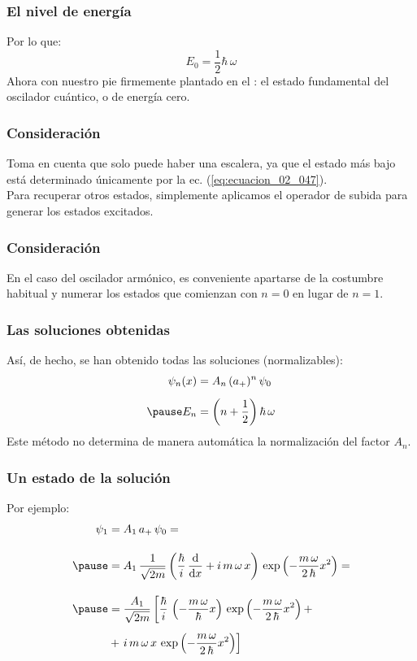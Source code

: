 \documentclass[12pt]{beamer}
\begin{document}
\begin{frame}
\frametitle{El nivel de energía}
Por lo que:
\pause
\begin{equation}
E_{0} = \dfrac{1}{2} \hbar \, \omega
\label{eq:ecuacion_02_049}
\end{equation}
\pause
Ahora con nuestro pie firmemente plantado en el : \pause el estado fundamental del oscilador cuántico, o de energía cero.
\end{frame}
\begin{frame}
\frametitle{Consideración}
Toma en cuenta que solo puede haber una escalera, ya que el estado más bajo está determinado únicamente por la ec. (\ref{eq:ecuacion_02_047}).
\\
\bigskip
\pause
Para recuperar otros estados, simplemente aplicamos el operador de subida para generar los estados excitados.
\end{frame}
\begin{frame}
\frametitle{Consideración}
En el caso del oscilador armónico, es conveniente apartarse de la costumbre habitual y numerar los estados que comienzan con $n = 0$ en lugar de $n = 1$.
\end{frame}
\begin{frame}
\frametitle{Las soluciones obtenidas}
Así, de hecho, se han obtenido todas las soluciones (normalizables):
\pause
\begin{eqnarray}
\begin{aligned}
\psi_{n} (x) &= A_{n} \, (a_{+})^{n} \, \psi_{0} \\[0.5em]\pause
E_{n} &= \left( n + \dfrac{1}{2} \right) \hbar \, \omega
\end{aligned}
\label{eq:ecuacion_02_050}
\end{eqnarray}
\pause
Este método no determina de manera automática la normalización del factor $A_{n}$.
\end{frame}
\begin{frame}
\frametitle{Un estado de la solución}
Por ejemplo:
\begin{eqnarray*}
\begin{aligned}
\psi_{1} &= A_{1} \, a_{+} \, \psi_{0} = \\[1em] \pause
&= A_{1} \, \dfrac{1}{\sqrt{2 m}} \left( \dfrac{\hbar}{i} \, \dv{x} + i \, m \, \omega \, x \right) \, \exp \left( - \dfrac{m \, \omega}{2 \, \hbar} x^{2} \right) = \\[1em] \pause
&= \dfrac{A_{1}}{\sqrt{2 m}} \left[ \dfrac{\hbar}{i} \, \left( - \dfrac{m \, \omega}{\hbar} x \right)  \, \exp \left( - \dfrac{m \, \omega}{2 \, \hbar} x^{2} \right) +  \right.\\[0.5em]
&+ \left. i \, m \, \omega \, x \, \exp \left( - \dfrac{m \, \omega}{2 \, \hbar} x^{2} \right) \right] 
\end{aligned}
\end{eqnarray*}
\end{frame}
\end{document}
